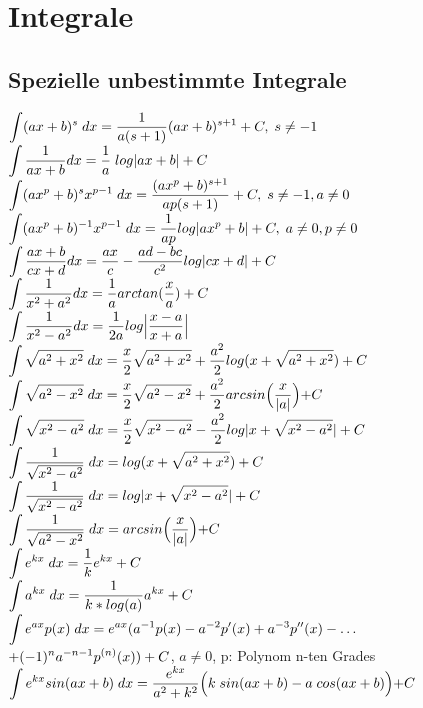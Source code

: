 
\section{Integrale}
\subsection{Spezielle unbestimmte Integrale}
$\mathlarger{\int (ax+b)^s\;dx= \frac{1}{a(s+1)}(ax+b)^{s+1} + C,\;s\neq -1}$\\
$\mathlarger{\int \frac{1}{ax+b}dx=\frac{1}{a}\;log|ax+b|+C}$\\
$\mathlarger{\int (ax^p+b)^sx^{p-1}\;dx = \frac{(ax^p+b)^{s+1}}{ap(s+1)}+C,\;s\neq -1, a \neq 0}$\\
$\mathlarger{\int (ax^p+b)^{-1}x^{p-1}\;dx=\frac{1}{ap}log|ax^p+b|+C,\;a\neq 0,p\neq 0}$\\
$\mathlarger{\int \frac{ax+b}{cx+d}dx=\frac{ax}{c}- \frac{ad-bc}{c^2} log|cx+d|+C}$\\
$\mathlarger{\int \frac{1}{x^2+a^2}dx=\frac{1}{a}arctan(\frac{x}{a})+C}$\\
$\mathlarger{\int \frac{1}{x^2-a^2}dx=\frac{1}{2a}log\Bigl|\frac{x-a}{x+a}\Bigl|}$\\
$\mathlarger{\int \sqrt{a^2+x^2}\;dx=\frac{x}{2}\sqrt{a^2+x^2}+\frac{a^2}{2} log(x+\sqrt{a^2+x^2})+C}$\\
$\mathlarger{\int \sqrt{a^2-x^2}\;dx= \frac{x}{2}\sqrt{a^2-x^2}+\frac{a^2}{2}arcsin\Bigl(\frac{x}{|a|}\Bigl)+C}$\\
$\mathlarger{\int \sqrt{x^2-a^2}\;dx= \frac{x}{2}\sqrt{x^2-a^2}-\frac{a^2}{2}log|x+\sqrt{x^2-a^2}|+C}$\\
$\mathlarger{\int \frac{1}{\sqrt{x^2-a^2}}\;dx=log(x+\sqrt{a^2+x^2})+C}$\\
$\mathlarger{\int \frac{1}{\sqrt{x^2-a^2}}\;dx=log|x+\sqrt{x^2-a^2}|+C}$\\
$\mathlarger{\int \frac{1}{\sqrt{a^2-x^2}}\;dx=arcsin\Bigl(\frac{x}{|a|}\Bigl)+C}$\\
$\mathlarger{\int e^{kx}\;dx=\frac{1}{k}e^{kx}+C}$\\
$\mathlarger{\int a^{kx}\;dx=\frac{1}{k*log(a)}a^{kx}+C}$\\
$\mathlarger{\int e^{ax}p(x)\;dx=e^{ax}(a^{-1}p(x)-a^{-2}p'(x)+a^{-3}p''(x)-\dots}$\\
$\mathlarger{+(-1)^na^{-n-1}p^{(n)}(x))+C}$, $a\neq 0$, p: Polynom n-ten Grades\\
$\mathlarger{\int e^{kx}sin(ax+b)\;dx=\frac{e^{kx}}{a^2+k^2}\Bigl(k\;sin(ax+b)- a\;cos(ax+b)\Bigl)+C}$\\
